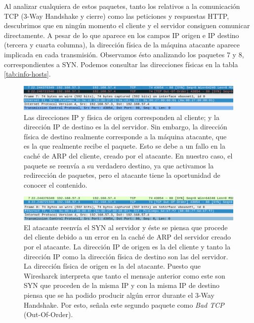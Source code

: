 \documentclass[11pt]{article}
\begin{document}
Al analizar cualquiera de estos paquetes, tanto los relativos a la comunicación TCP (3-Way Handshake y cierre) como las peticiones y
respuestas HTTP, descubrimos que en ningún momento el cliente y el servidor consiguen comunicar directamente. A pesar de lo que aparece
en los campos IP origen e IP destino (tercera y cuarta columna), la dirección física de la máquina atacante aparece implicada
en cada transmisión. Observamos ésto analizando los paquetes 7 y 8, correspondientes a SYN. Podemos consultar las direcciones físicas en
la tabla \ref{tab:info-hosts}.

\begin{figure}[H]
	\centering
	\includegraphics[width=160mm]{images/atack1/syn-client-atacker}
	\caption{Las direcciones IP y física de origen corresponden al cliente; y la dirección IP de destino es la del servidor. Sin embargo,
	la dirección física de destino realmente corresponde a la máquina atacante, que es la que realmente recibe el paquete. Esto se debe
	a un fallo en la caché de ARP del cliente, creado por el atacante. En nuestro caso, el paquete se reenvía a su verdadero destino,
	ya que activamos la redirección de paquetes, pero el atacante tiene la oportunidad de conocer el contenido.}
	\label{fig:syn-client-atacker}
\end{figure}

\begin{figure}[H]
	\centering
	\includegraphics[width=160mm]{images/atack1/syn-atacker-server}
	\caption{El atacante reenvía el SYN al servidor y éste se piensa que procede del cliente debido a un error en la caché de ARP del servidor
		creado por el atacante. La dirección IP de origen es la del cliente y tanto la dirección IP como la dirección física de destino son las del servidor. La dirección física de origen es la del atacante. Puesto que Wiresharck interpreta que tanto el mensaje anterior como este son SYN que proceden de la misma IP y con la misma IP de destino piensa que se ha podido producir algún error durante el 3-Way Handshake. Por esto, señala este segundo paquete como \textit{Bad TCP} (Out-Of-Order).}
	\label{fig:syn-atacker-server}
\end{figure}
\end{document}
